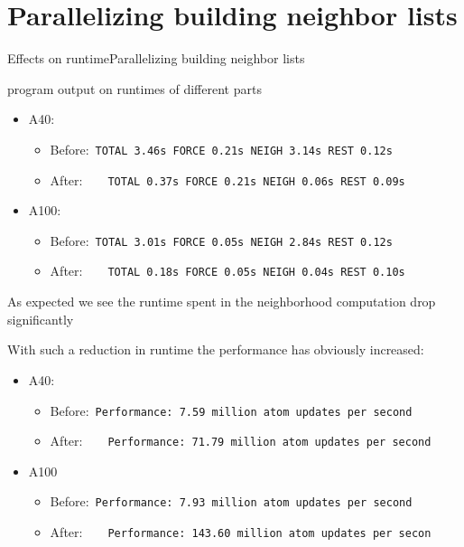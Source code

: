 
\section{Parallelizing building neighbor lists}

\begin{frame}{Effects on runtime}{Parallelizing building neighbor lists}


program output on runtimes of different parts

\begin{itemize}
\tightlist
\item
  A40:

  \begin{itemize}
  \tightlist
  \item
    Before:~\texttt{TOTAL\ 3.46s\ FORCE\ 0.21s\ NEIGH\ 3.14s\ REST\ 0.12s}
  \item
    After:~~~~\texttt{TOTAL\ 0.37s\ FORCE\ 0.21s\ NEIGH\ 0.06s\ REST\ 0.09s}
  \end{itemize}
\item
  A100:

  \begin{itemize}
  \tightlist
  \item
    Before:~\texttt{TOTAL\ 3.01s\ FORCE\ 0.05s\ NEIGH\ 2.84s\ REST\ 0.12s}
  \item
    After:~~~~\texttt{TOTAL\ 0.18s\ FORCE\ 0.05s\ NEIGH\ 0.04s\ REST\ 0.10s}
  \end{itemize}
\end{itemize}

As expected we see the runtime spent in the neighborhood computation
drop significantly

With such a reduction in runtime the performance has obviously
increased:

\begin{itemize}
\tightlist
\item
  A40:

  \begin{itemize}
  \tightlist
  \item
    Before:~\texttt{Performance:\ 7.59\ million\ atom\ updates\ per\ second}
  \item
    After:~~~~\texttt{Performance:\ 71.79\ million\ atom\ updates\ per\ second}
  \end{itemize}
\item
  A100

  \begin{itemize}
  \tightlist
  \item
    Before:~\texttt{Performance:\ 7.93\ million\ atom\ updates\ per\ second}
  \item
    After:~~~~\texttt{Performance:\ 143.60\ million\ atom\ updates\ per\ secon}
  \end{itemize}
\end{itemize}


\end{frame}

